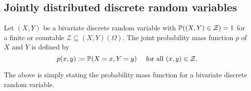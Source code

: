 \documentclass[10pt, a4paper]{article}
\begin{document}
\subsection{Jointly distributed discrete random variables}

\begin{definition}
    Let $(X, Y)$ be a bivariate discrete random variable with $\P((X, Y) \in \mathcal{Z}) = 1$ for a finite or countable $\mathcal{Z} \subseteq (X, Y)(\Omega)$.
    The joint probability mass function $p$ of $X$ and $Y$ is defined by
    \[
    p(x, y) := \P(X = x, Y = y)\quad\text{ for all } (x, y) \in \mathcal{Z}.
    \]
\end{definition}
The above is simply stating the probability mass function for a bivariate discrete random variable.
\end{document}
